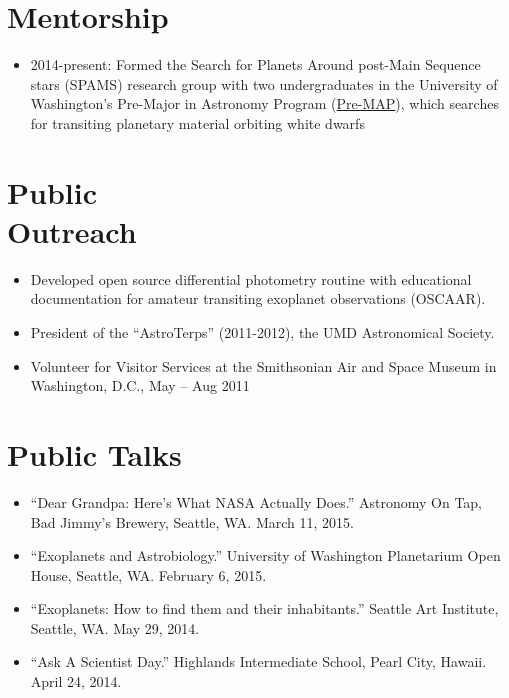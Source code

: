 \documentclass[margin]{res}
\begin{document}
\begin{resume}
\section{Mentorship}
\begin{itemize}   
\item 2014-present: Formed the Search for Planets Around post-Main Sequence stars (SPAMS) research group with two undergraduates in the University of Washington's Pre-Major in Astronomy Program (\href{http://www.astro.washington.edu/users/premap/}{Pre-MAP}), which searches for transiting planetary material orbiting white dwarfs\\
\end{itemize}

\section{Public \\ Outreach}             
\begin{itemize}
\item Developed open source differential photometry routine with educational documentation for amateur transiting exoplanet observations (OSCAAR).

\item President of the ``AstroTerps'' (2011-2012), the UMD Astronomical Society.

\item Volunteer for Visitor Services at the Smithsonian Air and Space Museum in Washington, D.C., May -- Aug 2011\\
\end{itemize}


\section{Public Talks}
\begin{itemize}
\item ``Dear Grandpa: Here's What NASA Actually Does.'' Astronomy On Tap, Bad Jimmy's Brewery, Seattle, WA. March 11, 2015.

\item ``Exoplanets and Astrobiology.'' University of Washington Planetarium Open House, Seattle, WA. February 6, 2015.

\item ``Exoplanets: How to find them and their inhabitants.'' Seattle Art Institute, Seattle, WA. May 29, 2014.

\item ``Ask A Scientist Day.'' Highlands Intermediate School, Pearl City, Hawaii. April 24, 2014.


\end{itemize}
\end{resume}
\end{document}
